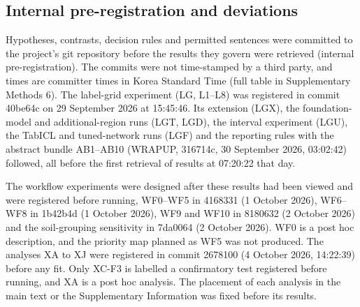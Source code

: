 \subsection{Internal pre-registration and deviations}\label{sec:m-registration}

Hypotheses, contrasts, decision rules and permitted sentences were committed to the project's git repository before the results they govern were retrieved (internal pre-registration). The commits were not time-stamped by a third party, and times are committer times in Korea Standard Time (full table in Supplementary Methods 6). The label-grid experiment (LG, L1--L8) was registered in commit 40be64c on 29 September 2026 at 15:45:46. Its extension (LGX), the foundation-model and additional-region runs (LGT, LGD), the interval experiment (LGU), the TabICL and tuned-network runs (LGF) and the reporting rules with the abstract bundle AB1--AB10 (WRAPUP, 316714c, 30 September 2026, 03:02:42) followed, all before the first retrieval of results at 07:20:22 that day.

The workflow experiments were designed after these results had been viewed and were registered before running, WF0--WF5 in 4168331 (1 October 2026), WF6--WF8 in 1b42b4d (1 October 2026), WF9 and WF10 in 8180632 (2 October 2026) and the soil-grouping sensitivity in 7da0064 (2 October 2026). WF0 is a post hoc description, and the priority map planned as WF5 was not produced. The analyses XA to XJ were registered in commit 2678100 (4 October 2026, 14:22:39) before any fit. Only XC-F3 is labelled a confirmatory test registered before running, and XA is a post hoc analysis. The placement of each analysis in the main text or the Supplementary Information was fixed before its results.

